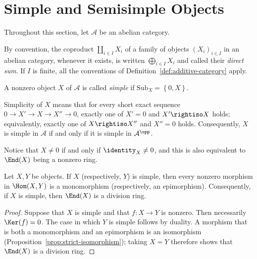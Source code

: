 
\section{Simple and Semisimple Objects}\label{sec:semisimple}
\hypertarget{o014.aljabr2.chapter2.simplicity-and-semisimplicity}{ }

Throughout this section, let $\mathcal{A}$ be an abelian category.

\begin{convention}\label{con:direct-sum}
	By convention, the coproduct $\coprod_{i \in I} X_i$ of a family of
	objects $(X_i)_{i \in I}$ in an abelian category, whenever it exists, is
	written $\bigoplus_{i \in I} X_i$ and called their \emph{direct sum}. If
	$I$ is finite, all the conventions of Definition~\ref{def:additive-category}
	apply.
\end{convention}

\begin{definition}
	A nonzero object $X$ of $\mathcal{A}$ is called \emph{simple} if
	$\mathrm{Sub}_X=\left\{0,X\right\}$.
\end{definition}

Simplicity of $X$ means that for every short exact sequence
$0\to X'\to X\to X''\to0$, exactly one of $X'=0$ and $X'\rightiso X$
holds; equivalently, exactly one of $X\rightiso X''$ and $X''=0$ holds.
Consequently, $X$ is simple in $\mathcal{A}$ if and only if it is simple in
$\mathcal{A}^{\opp}$.

Notice that $X\neq0$ if and only if $\identity_X\neq0$, and this is also
equivalent to $\End(X)$ being a nonzero ring.

\begin{lemma}
	Let $X,Y$ be objects. If $X$ (respectively, $Y$) is simple, then every
	nonzero morphism in $\Hom(X,Y)$ is a monomorphism (respectively, an
	epimorphism). Consequently, if $X$ is simple, then $\End(X)$ is a division
	ring.
\end{lemma}
\begin{proof}
	Suppose that $X$ is simple and that $f:X\to Y$ is nonzero. Then necessarily
	$\Ker(f)=0$. The case in which $Y$ is simple follows by duality. A morphism
	that is both a monomorphism and an epimorphism is an isomorphism
	(Proposition~\ref{prop:strict-isomorphism}); taking $X=Y$ therefore shows
	that $\End(X)$ is a division ring.
\end{proof}

